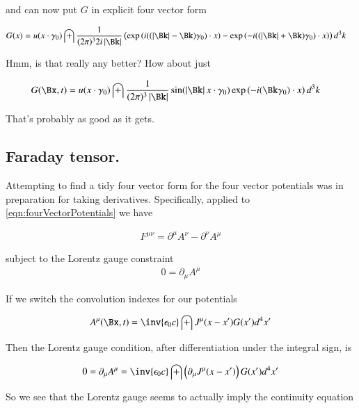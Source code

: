 \documentclass{article}
\begin{document}
and can now put $G$ in explicit four vector form

\begin{align*}
G(x)
&= u(x \cdot \gamma_0) \int
\frac{1}{(2\pi)^3 2 i \Abs{\Bk}}
\left(
\exp\left( i ((\Abs{\Bk} -\Bk)\gamma_0) \cdot x \right)
-\exp\left( -i ((\Abs{\Bk} +\Bk)\gamma_0) \cdot x \right)
\right)
d^3 k
\end{align*}

Hmm, is that really any better?  How about just

\begin{align*}
G(\Bx, t)
&= u(x \cdot \gamma_0) \int
\frac{1}{(2\pi)^3 \Abs{\Bk}}
\sin( \Abs{\Bk} x \cdot \gamma_0 )
\exp\left( -i (\Bk \gamma_0) \cdot x \right)
d^3 k
\end{align*}

That's probably as good as it gets.

\subsection{ Faraday tensor. }

Attempting to find a tidy four vector form for the four vector potentials was in preparation for taking derivatives.
Specifically, applied to \ref{eqn:fourVectorPotentials} we have

\begin{align*}
F^{\mu\nu} = \partial^\mu A^\nu - \partial^\nu A^\mu
\end{align*}

subject to the Lorentz gauge constraint
\begin{align*}
0 = \partial_\mu A^\mu
\end{align*}

If we switch the convolution indexes for our potentials

\begin{align*}
{A^\mu}(\Bx, t) &= \inv{\epsilon_0 c} \int J^\mu(x - x') G(x') d^4 x' \\
\end{align*}

Then the Lorentz gauge condition, after differentiation under the integral sign, is

\begin{align*}
0 = \partial_\mu A^\mu &= \inv{\epsilon_0 c} \int \left(\partial_\mu J^\mu(x - x') \right) G(x') d^4 x' \\
\end{align*}

So we see that the Lorentz gauge seems to actually imply the continuity equation
\end{document}

